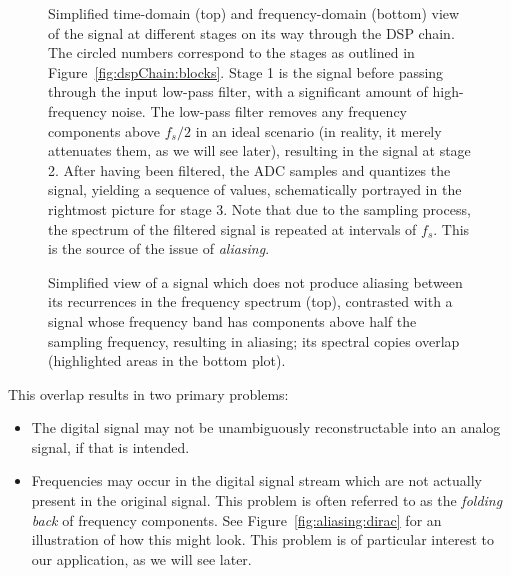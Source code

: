 \begin{figure}[p]
    \centering
    
    
    \caption[Signals Passing Through the DSP Chain (Simplified)]{%
        Simplified  time-domain  (top)   and  frequency-domain  (bottom)  view
        of  the  signal  at  different  stages on  its  way  through  the  DSP
        chain. The  circled  numbers  correspond  to the  stages  as  outlined
        in  Figure~\ref{fig:dspChain:blocks}.  Stage  1 is  the signal  before
        passing through the  input low-pass filter, with  a significant amount
        of  high-frequency noise. The  low-pass filter  removes any  frequency
        components  above ${f_s}/{2}$  in an  ideal scenario  (in reality,  it
        merely attenuates them, as we will see later), resulting in the signal
        at  stage  2.\protect\newline
        After  having  been  filtered,  the  ADC  samples  and  quantizes  the
        signal, yielding a sequence of  values, schematically portrayed in the
        rightmost picture for stage 3.  Note that due to the sampling process,
        the  spectrum of  the  filtered  signal is  repeated  at intervals  of
        $f_s$. This is the source of the issue of \emph{aliasing}.%
    }
    \label{fig:dspChain:signals}
\end{figure}
\begin{figure}[p]
    \centering
    
    \caption[Aliasing Illustrated via Signal Frequency Band]{%
        Simplified view  of a signal  which does not produce  aliasing between
        its recurrences  in the  frequency spectrum  (top), contrasted  with a
        signal whose  frequency band  has components  above half  the sampling
        frequency,  resulting   in  aliasing;  its  spectral   copies  overlap
        (highlighted areas in the bottom plot).%
    }
    \label{fig:aliasing:band}
\end{figure}

This overlap results in two primary problems:
\begin{itemize}\tightlist
    \item
        The digital  signal may not  be unambiguously reconstructable  into an
        analog signal, if that is intended.
    \item
        Frequencies  may occur  in the  digital  signal stream  which are  not
        actually  present  in  the  original  signal. This  problem  is  often
        referred to  as the  \emph{folding back} of  frequency components. See
        Figure~\ref{fig:aliasing:dirac} for an illustration  of how this might
        look.  This problem  is of particular interest to  our application, as
        we will see later.
\end{itemize}

